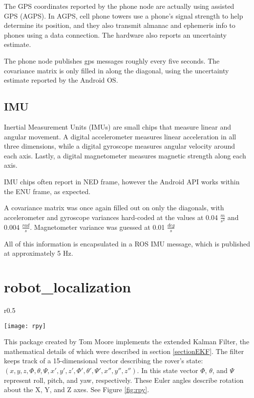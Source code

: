 The GPS coordinates reported by the phone node are actually using assisted GPS (AGPS). In AGPS, cell phone towers use a phone's signal strength to help determine its position, and they also transmit almanac and ephemeris info to phones using a data connection. The hardware also reports an uncertainty estimate.\cite{}

The phone node publishes gps messages roughly every five seconds. The covariance matrix is only filled in along the diagonal, using the uncertainty estimate reported by the Android OS.

\subsection{IMU}

Inertial Measurement Units (IMUs) are small chips that measure linear and angular movement. A digital accelerometer measures linear acceleration in all three dimensions, while a digital gyroscope measures angular velocity around each axis. Lastly, a digital magnetometer measures magnetic strength along each axis.

IMU chips often report in NED frame, however the Android API works within the ENU frame, as expected.

A covariance matrix was once again filled out on only the diagonals, with accelerometer and gyroscope variances hard-coded at the values at 0.04 \(\frac{m}{s^2}\) and 0.004 \(\frac{rad}{s}\). \cite{Nexus4Paper}
Magnetometer variance was guessed at 0.01 \(\frac{deg}{s}\)

All of this information is encapsulated in a ROS IMU message, which is published at approximately 5 Hz. 

\section{robot\_localization} \label{sectionRobotLocalization}

\begin{wrapfigure}{r}{0.5\textwidth} 
	\caption{Roll, Pitch, and Yaw
	\label{fig:rpy}
	\cite{fig_rpy}}
	\centering
	\texttt{[image: rpy]}
\end{wrapfigure}

This package created by Tom Moore implements the extended Kalman Filter, the mathematical details of which were described in section \ref{sectionEKF}. The filter keeps track of a 15-dimensional vector describing the rover's state: \((x,y,z,\Phi,\theta,\Psi,x',y',z',\Phi ',\theta ',\Psi ', x'', y'', z'')\). In this state vector  \(\Phi\), \(\theta\), and \(\Psi\) represent roll, pitch, and yaw, respectively. These Euler angles describe rotation about the X, Y, and Z axes. See Figure \ref{fig:rpy}. \cite{robot_localization_paper}

